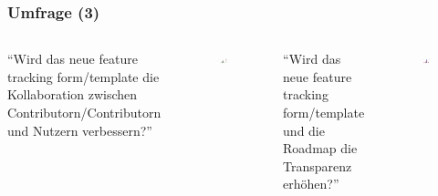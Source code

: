 \documentclass{beamer}
\begin{document}
\begin{frame}
\frametitle{Umfrage (3)}
\begin{columns}
  ``Wird das neue feature tracking form/template die Kollaboration zwischen Contributorn/Contributorn und Nutzern verbessern?''
   \begin{figure}[h!]
    \centering
    \includegraphics[scale=0.25,keepaspectratio=true]{./amarok3bchalo3bc.png}
   \end{figure}
 ``Wird das neue feature tracking form/template und die Roadmap die Transparenz erh\"ohen?''\newline
   \begin{figure}[h!]
    \centering
    \includegraphics[scale=0.25,keepaspectratio=true]{./amarok3dhalo3d.png}
   \end{figure}
\end{columns}
\end{frame}
\end{document}
